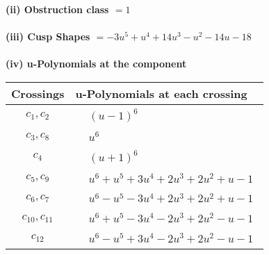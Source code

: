 \documentclass[1p]{elsarticle_modified}
\theoremstyle{definition}
\begin{document}
\flushleft \textbf{(ii) Obstruction class $= 1$}\\~\\
\flushleft \textbf{(iii) Cusp Shapes $= -3 u^5+u^4+14 u^3- u^2-14 u-18$}\\~\\
\newpage\renewcommand{\arraystretch}{1}
\flushleft \textbf{(iv) u-Polynomials at the component}\newline \\
\begin{tabular}{m{50pt}|m{274pt}}
Crossings & \hspace{64pt}u-Polynomials at each crossing \\
\hline $$\begin{aligned}c_{1},c_{2}\end{aligned}$$&$\begin{aligned}
&(u-1)^6
\end{aligned}$\\
\hline $$\begin{aligned}c_{3},c_{8}\end{aligned}$$&$\begin{aligned}
&u^6
\end{aligned}$\\
\hline $$\begin{aligned}c_{4}\end{aligned}$$&$\begin{aligned}
&(u+1)^6
\end{aligned}$\\
\hline $$\begin{aligned}c_{5},c_{9}\end{aligned}$$&$\begin{aligned}
&u^6+u^5+3 u^4+2 u^3+2 u^2+u-1
\end{aligned}$\\
\hline $$\begin{aligned}c_{6},c_{7}\end{aligned}$$&$\begin{aligned}
&u^6- u^5-3 u^4+2 u^3+2 u^2+u-1
\end{aligned}$\\
\hline $$\begin{aligned}c_{10},c_{11}\end{aligned}$$&$\begin{aligned}
&u^6+u^5-3 u^4-2 u^3+2 u^2- u-1
\end{aligned}$\\
\hline $$\begin{aligned}c_{12}\end{aligned}$$&$\begin{aligned}
&u^6- u^5+3 u^4-2 u^3+2 u^2- u-1
\end{aligned}$\\
\hline
\end{tabular}\\~\\
\end{document}
